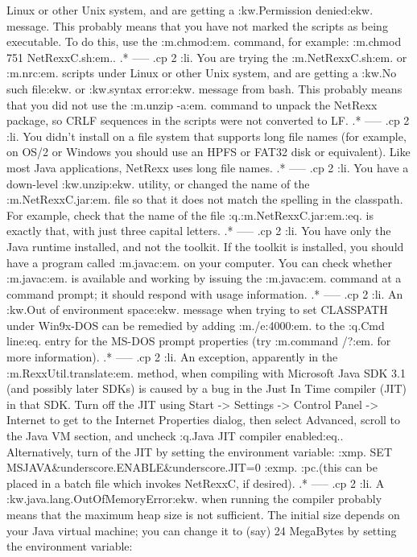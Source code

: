 Linux or other Unix system, and are getting a :kw.Permission denied:ekw.
message.  This probably means that you have not marked the scripts as
being executable.  To do this, use the :m.chmod:em. command, for
example: :m.chmod 751 NetRexxC.sh:em..
.* -----
.cp 2
:li.
You are trying the :m.NetRexxC.sh:em. or :m.nrc:em. scripts under
Linux or other Unix system, and are getting a :kw.No such file:ekw. or
:kw.syntax error:ekw. message from bash.  This probably means that you
did not use the :m.unzip -a:em. command to unpack the NetRexx package,
so CRLF sequences in the scripts were not converted to LF.
.* -----
.cp 2
:li.
You didn't install on a file system that supports long file names (for
example, on OS/2 or Windows you should use an HPFS or FAT32 disk or
equivalent).  Like most Java applications, NetRexx uses long file names.
.* -----
.cp 2
:li.
You have a down-level :kw.unzip:ekw. utility, or changed the name of
the :m.NetRexxC.jar:em. file so that it does not match the spelling in
the classpath.  For example, check that the name of the file
:q.:m.NetRexxC.jar:em.:eq. is exactly that, with just three capital
letters.
.* -----
.cp 2
:li.
You have only the Java runtime installed, and not the toolkit.  If the
toolkit is installed, you should have a program called :m.javac:em. on your
computer.
You can check whether :m.javac:em. is available and working by issuing
the :m.javac:em. command at a command prompt; it should respond with
usage information.
.* -----
.cp 2
:li.
An :kw.Out of environment space:ekw. message when trying to set CLASSPATH
under Win9x-DOS can be remedied by adding :m./e:4000:em. to the :q.Cmd
line:eq. entry for the MS-DOS prompt properties (try :m.command /?:em.
for more information).
.* -----
.cp 2
:li.
An exception, apparently in the :m.RexxUtil.translate:em. method, when
compiling with Microsoft Java SDK 3.1 (and possibly later SDKs) is
caused by a bug in the Just In Time compiler (JIT) in that SDK.
Turn off the JIT using Start -> Settings -> Control Panel -> Internet to
get to the Internet Properties dialog, then select Advanced, scroll to
the Java VM section, and uncheck :q.Java JIT compiler enabled:eq..
Alternatively, turn of the JIT by setting the environment variable:
:xmp.
SET MSJAVA&underscore.ENABLE&underscore.JIT=0
:exmp.
:pc.(this can be placed in a batch file which invokes NetRexxC, if
desired).
.* -----
.cp 2
:li.
A :kw.java.lang.OutOfMemoryError:ekw. when running the compiler probably
means that the maximum heap size is not sufficient.  The initial size
depends on your Java virtual machine; you can change it to (say) 24
MegaBytes by setting the environment variable:
